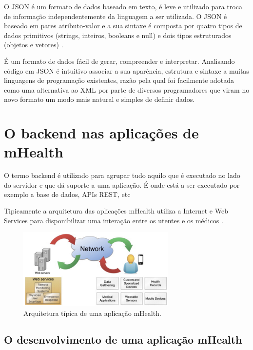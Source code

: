 O \gls{JSON} é um formato de dados baseado em texto, é leve e utilizado para troca de informação independentemente da linguagem a ser utilizada. O \gls{JSON} é baseado em pares atributo-valor e a sua sintaxe é composta por quatro tipos de dados primitivos (strings, inteiros, booleans e null) e dois tipos estruturados (objetos e vetores) \cite{json}. 
\par
É um formato de dados  fácil de gerar, compreender e interpretar. Analisando código em \gls{JSON} é intuitivo associar a sua aparência, estrutura e sintaxe a muitas linguagens de programação existentes, razão pela qual foi facilmente adotada como uma alternativa ao \gls{XML} por parte de diversos programadores que viram no novo formato um modo mais natural e simples de definir dados.

\section{O backend nas aplicações de mHealth}
O termo backend é utilizado para agrupar tudo aquilo que é executado no lado do servidor e que dá suporte a uma aplicação. É onde está a ser executado por exemplo a base de dados, \gls{API}s \gls{REST}, etc 

Tipicamente a arquitetura das aplica\c c\~oes mHealth utiliza a Internet e Web Services para disponibilizar uma intera\c c\~ao entre os utentes e os m\'edicos \cite{mhealth}.

\begin{figure}[H]
  \centering
  \includegraphics[width=0.7\textwidth]{imgs/mHealthArch.png}
  \caption[Arquitetura t\'ipica de uma  aplica\c c\~ao mHealth]{Arquitetura t\'ipica de uma  aplica\c c\~ao mHealth. \cite{mhealth}}
  
  \label{f:mhealtharch}
\end{figure}


\subsection{O desenvolvimento de uma aplica\c c\~ao mHealth}

